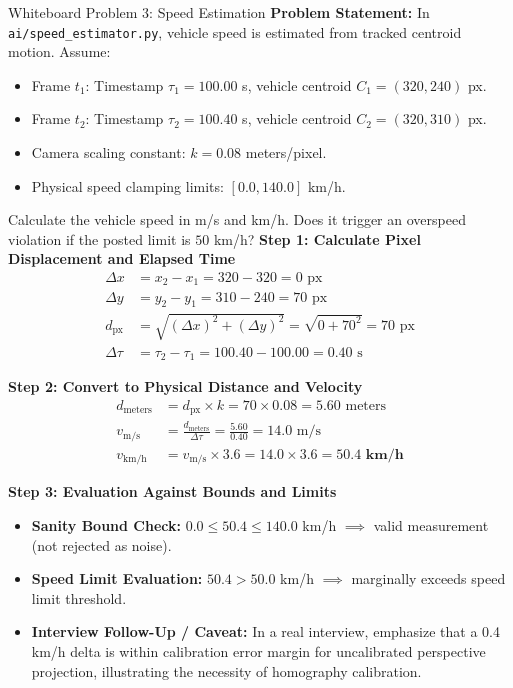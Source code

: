 \documentclass[11pt,a4paper,oneside]{report}
\begin{document}
\begin{interviewq}{Whiteboard Problem 3: Speed Estimation}
\textbf{Problem Statement:}
In \texttt{ai/speed\_estimator.py}, vehicle speed is estimated from tracked centroid motion. Assume:
\begin{itemize}
    \item Frame $t_1$: Timestamp $\tau_1 = 100.00$ s, vehicle centroid $C_1 = (320, 240)$ px.
    \item Frame $t_2$: Timestamp $\tau_2 = 100.40$ s, vehicle centroid $C_2 = (320, 310)$ px.
    \item Camera scaling constant: $k = 0.08$ meters/pixel.
    \item Physical speed clamping limits: $[0.0, 140.0]$ km/h.
\end{itemize}
Calculate the vehicle speed in m/s and km/h. Does it trigger an overspeed violation if the posted limit is $50$ km/h?
\tcblower
\textbf{Step 1: Calculate Pixel Displacement and Elapsed Time}
\begin{align*}
\Delta x &= x_2 - x_1 = 320 - 320 = 0 \text{ px} \\
\Delta y &= y_2 - y_1 = 310 - 240 = 70 \text{ px} \\
d_{\text{px}} &= \sqrt{(\Delta x)^2 + (\Delta y)^2} = \sqrt{0 + 70^2} = 70 \text{ px} \\[6pt]
\Delta \tau &= \tau_2 - \tau_1 = 100.40 - 100.00 = 0.40 \text{ s}
\end{align*}

\textbf{Step 2: Convert to Physical Distance and Velocity}
\begin{align*}
d_{\text{meters}} &= d_{\text{px}} \times k = 70 \times 0.08 = 5.60 \text{ meters} \\[6pt]
v_{\text{m/s}} &= \frac{d_{\text{meters}}}{\Delta \tau} = \frac{5.60}{0.40} = 14.0 \text{ m/s} \\[6pt]
v_{\text{km/h}} &= v_{\text{m/s}} \times 3.6 = 14.0 \times 3.6 = \mathbf{50.4 \text{ km/h}}
\end{align*}

\textbf{Step 3: Evaluation Against Bounds and Limits}
\begin{itemize}
    \item \textbf{Sanity Bound Check:} $0.0 \le 50.4 \le 140.0$ km/h $\implies$ valid measurement (not rejected as noise).
    \item \textbf{Speed Limit Evaluation:} $50.4 > 50.0$ km/h $\implies$ marginally exceeds speed limit threshold.
    \item \textbf{Interview Follow-Up / Caveat:} In a real interview, emphasize that a 0.4 km/h delta is within calibration error margin for uncalibrated perspective projection, illustrating the necessity of homography calibration.
\end{itemize}
\end{interviewq}
\end{document}
